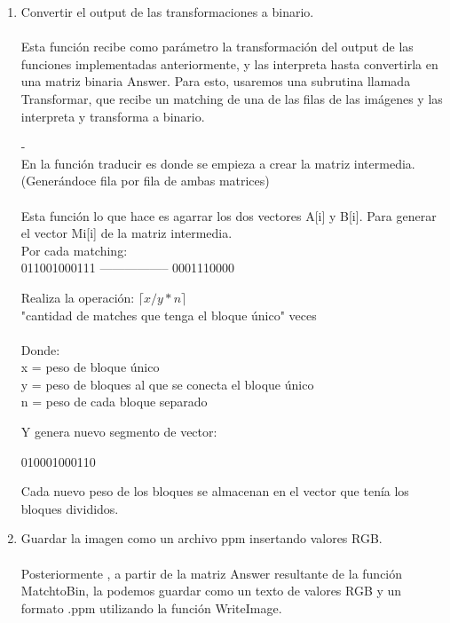 \documentclass{article}
\newcommand{\TITLE}[1]{\item[#1]}
\begin{document}
		\begin{enumerate}
			\item 	Convertir el output de las transformaciones a binario.\\\\
			Esta función recibe como parámetro la transformación del output de las funciones implementadas anteriormente, y las interpreta hasta convertirla en una matriz binaria Answer. Para esto, usaremos una subrutina llamada Transformar, que recibe un matching de una de las filas de las imágenes y las interpreta y transforma a binario.\\
		-\\
			En la función traducir es donde se empieza a crear la matriz intermedia. (Generándoce fila por fila de ambas matrices)
	\\\\
			Esta función lo que hace es agarrar los dos vectores A[i] y B[i]. Para generar el vector Mi[i] de la matriz intermedia.\\
			
		Por cada matching:\\
		011001000111 ----------------- 0001110000	
		
		Realiza la operación: $\lceil{x/y * n}\rceil$ 
		\\"cantidad de matches que tenga el bloque único" veces\\
		\\Donde:\\ x = peso de bloque único \\ y = peso de bloques al que se  conecta el bloque único \\ n = peso de cada bloque separado
		
		Y genera nuevo segmento de vector:
		
		010001000110				
		
		Cada nuevo peso de los bloques se almacenan en el vector que tenía los bloques divididos.
		
		\item Guardar la imagen como un archivo ppm insertando valores RGB.\\\\
		Posteriormente , a partir de la matriz Answer resultante de la función MatchtoBin, la podemos guardar como un texto de valores RGB y un formato .ppm utilizando la función WriteImage.\\
		
		\end{enumerate}
\end{document}
